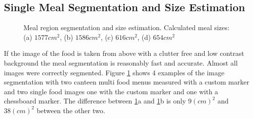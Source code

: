 \subsection{Single Meal Segmentation and Size Estimation}
\begin{figure}[htb]
	\centering
	\hspace{\fill}%
	\hspace{\fill}%
	\hspace{\fill}%
	\hspace{\fill}%
	\hspace{\fill}%
	\caption{Meal region segmentation and size estimation. Calculated meal sizes: {(a)} $1577 cm^2$, {(b)} $1586 cm^2$, {(c)} $616 cm^2$, {(d)} $654 cm^2$}
	\label{fig:mealSegmentation}
\end{figure}

If the image of the food is taken from above with a clutter free and low contrast background the meal segmentation is reasonably fast and accurate. Almost all images were correctly segmented. Figure \ref{fig:mealSegmentation} shows 4 examples of the image segmentation with two canteen multi food menus measured with a custom marker and two single food images one with the custom marker and one with a chessboard marker. The difference between \ref{fig:mealSegmentation}a and \ref{fig:mealSegmentation}b is only $9 (cm)^2$ and $38 (cm)^2$ between the other two.

